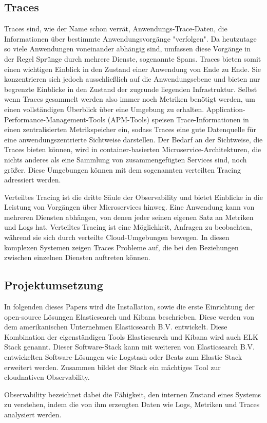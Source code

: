 \subsection{Traces}
Traces sind, wie der Name schon verrät,  
Anwendungs-Trace-Daten, die Informationen über bestimmte Anwendungsvorgänge
"verfolgen". Da heutzutage so viele Anwendungen voneinander abhängig sind, 
umfassen diese Vorgänge in der Regel Sprünge durch mehrere Dienste, sogenannte Spans.
Traces bieten somit einen wichtigen Einblick in den Zustand einer Anwendung 
von Ende zu Ende. Sie konzentrieren sich jedoch ausschließlich auf die Anwendungsebene
und bieten nur begrenzte Einblicke in den Zustand der zugrunde liegenden Infrastruktur.
Selbst wenn Traces gesammelt werden also immer noch Metriken benötigt werden, 
um einen vollständigen Überblick über eine Umgebung zu erhalten. 
Application-Performance-Management-Tools (APM-Tools) speisen Trace-Informationen in einen
zentralisierten Metrikspeicher ein, sodass Traces eine gute Datenquelle für eine anwendungszentrierte Sichtweise darstellen.
Der Bedarf an der Sichtweise, die Traces bieten können, wird in container-basierten
Microservice-Architekturen, die nichts anderes als eine Sammlung von zusammengefügten
Services sind, noch größer. Diese Umgebungen können mit dem sogenannten
verteilten Tracing adressiert werden.

Verteiltes Tracing ist die dritte Säule der Observability und bietet Einblicke in die 
Leistung von Vorgängen über Microservices hinweg. Eine Anwendung kann von mehreren Diensten 
abhängen, von denen jeder seinen eigenen Satz an Metriken und Logs hat. 
Verteiltes Tracing ist eine Möglichkeit, Anfragen zu beobachten, während sie sich 
durch verteilte Cloud-Umgebungen bewegen. In diesen komplexen Systemen zeigen Traces 
Probleme auf, die bei den Beziehungen zwischen einzelnen Diensten auftreten können.

\subsection{Projektumsetzung}
In folgenden dieses Papers wird die Installation, sowie die erste Einrichtung
der open-source Lösungen Elasticsearch und Kibana beschrieben.
Diese werden von dem amerikanischen Unternehmen Elasticsearch B.V.
entwickelt. Diese Kombination der eigenständigen Tools
Elasticsearch und Kibana wird auch ELK Stack genannt.  
Dieser Software-Stack kann mit weiteren von Elasticsearch B.V. entwickelten
Software-Lösungen wie Logstash oder Beats zum Elastic Stack erweitert werden.
Zusammen bildet der Stack ein mächtiges Tool zur cloudnativen
Observability.

Observability bezeichnet dabei die Fähigkeit, den internen Zustand eines Systems zu verstehen, 
indem die von ihm erzeugten Daten wie Logs, Metriken und Traces analysiert werden.





